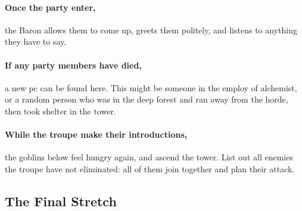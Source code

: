 \begin{multicols}{2}
\theAlchemist

\paragraph{Once the party enter,}
the Baron allows them to come up, greets them politely, and listens to anything they have to say.

\paragraph{If any party members have died,}
a new \gls{pc} can be found here.
This might be someone in the employ of \gls{alchemist}, or a random person who was in the deep forest and ran away from the horde, then took shelter in the tower.

\paragraph{While the troupe make their introductions,}
the goblins below feel hungry again, and ascend the tower.
List out all enemies the troupe have not eliminated: all of them join together and plan their attack.

\end{multicols}

\subsection{The Final Stretch}

